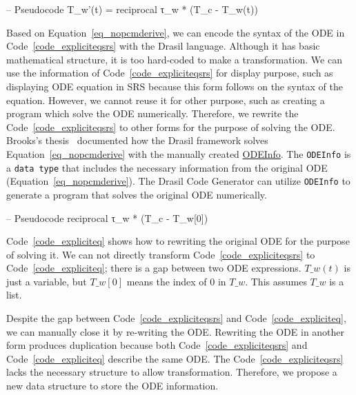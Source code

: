 \begin{listing}[ht]
\begin{haskell1}
-- Pseudocode
T_w'(t) = reciprocal τ_w * (T_c - T_w(t))
\end{haskell1}
\label{code_expliciteqsrs}
\end{listing}

Based on Equation~\ref{eq_nopcmderive}, we can encode the syntax of the ODE in Code~\ref{code_expliciteqsrs} with the Drasil language. Although it has basic mathematical structure, it is too hard-coded to make a transformation. We can use the information of Code~\ref{code_expliciteqsrs} for display purpose, such as displaying ODE equation in SRS because this form follows on the syntax of the equation. However, we cannot reuse it for other purpose, such as creating a program which solve the ODE numerically. Therefore, we rewrite the Code~\ref{code_expliciteqsrs} to other forms for the purpose of solving the ODE. Brooks's thesis~\citep{brooks} documented how the Drasil framework solves Equation~\ref{eq_nopcmderive} with the manually created \href{https://jacquescarette.github.io/Drasil/docs/drasil-code-0.1.9.0/Language-Drasil-Code.html#t:ODEInfo}{ODEInfo}. The \verb|ODEInfo| is a \verb|data type| that includes the necessary information from the original ODE (Equation~\ref{eq_nopcmderive}). The Drasil Code Generator can utilize \verb|ODEInfo| to generate a program that solves the original ODE numerically. 
\begin{listing}[ht]
\begin{haskell1}
-- Pseudocode
reciprocal τ_w * (T_c - T_w[0])
\end{haskell1}
\label{code_expliciteq}
\end{listing}
Code~\ref{code_expliciteq} shows how to rewriting the original ODE for the purpose of solving it. We can not directly transform Code~\ref{code_expliciteqsrs} to Code~\ref{code_expliciteq}; there is a gap between two ODE expressions. $T\_w(t)$ is just a variable, but $T\_w[0]$ means the index of $0$ in $T\_w$. This assumes $T\_w$ is a list.

Despite the gap between Code~\ref{code_expliciteqsrs} and Code~\ref{code_expliciteq}, we can manually close it by re-writing the ODE. Rewriting the ODE in another form produces duplication because both Code~\ref{code_expliciteqsrs} and Code~\ref{code_expliciteq} describe the same ODE. The Code~\ref{code_expliciteqsrs} lacks the necessary structure to allow transformation. Therefore, we propose a new data structure to store the ODE information.

